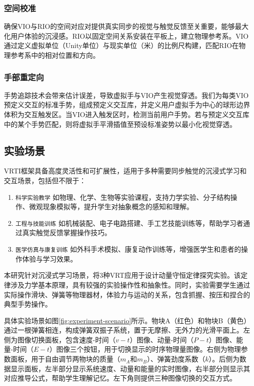 \documentclass[runningheads]{llncs}
\begin{document}
\subsubsection{空间校准}
确保VIO与RIO的空间对应对提供真实同步的视觉与触觉反馈至关重要，能够最大化用户体验的沉浸感。RIO以固定空间关系安装在平板上，建立物理参考系。VIO通过定义虚拟单位（Unity单位）与现实单位（米）的比例尺构建，匹配RIO在物理参考系中的相对位置和方向。

\subsubsection{手部重定向}
手势追踪技术会带来估计误差，导致虚拟手与VIO产生视觉穿透。我们为每类VIO预定义交互的标准手势，组成预定义交互库，并定义用户虚拟手为中心的球形边界体积为交互触发区。当VIO进入触发区时，检测当前用户手势。若与预定义交互库中的某个手势匹配，则将虚拟手平滑插值至预设标准姿势以最小化视觉穿透。


\subsection{实验场景}
VRTI框架具备高度灵活性和可扩展性，适用于多种需要同步触觉的沉浸式学习和交互场景，包括但不限于：

\begin{enumerate}[label={\arabic*)}]
  \item \texttt{科学实验教学} 如物理、化学、生物等实验课程，支持力学实验、分子结构操作、微观现象模拟等，提升学生对抽象概念的感知和理解。
  \item \texttt{工程与技能训练} 如机械装配、电子电路搭建、手工艺技能训练等，帮助学习者通过真实触觉反馈掌握操作技巧。
  \item \texttt{医学仿真与康复训练} 如外科手术模拟、康复动作训练等，增强医学生和患者的操作体验与学习效果。
\end{enumerate}

本研究针对沉浸式学习场景，将3种VRT应用于设计动量守恒定律探究实验。该定律涉及力学基本原理，具有较强的实验操作性和抽象性。同时，实验需要学生通过实际操作滑块、弹簧等物理器材，体验力与运动的关系，包含抓握、按压和捏合的典型手势操作。

具体实验场景如图\ref{fig:experiment-scenario}所示。物块A（红色）和物块B（黄色）通过一根弹簧相连，构成弹簧双振子系统，置于无摩擦、无外力的光滑平面上。左侧为图像切换面板，包含速度-时间（$v-t$）图像、动量-时间（$P-t$）图像、能量-时间（$E-t$）图像三个按钮，用于切换显示的时序物理量图像。右侧为物理参数面板，用于自由调节两物块的质量（$m_A$和$m_B$）、弹簧劲度系数（$k$）。后侧为数据显示面板，左半部分显示系统速度、动量和能量的实时图像，右半部分则显示其对应推导公式，帮助学生理解记忆。左下角则提供三种图像切换的交互方式。
\end{document}
